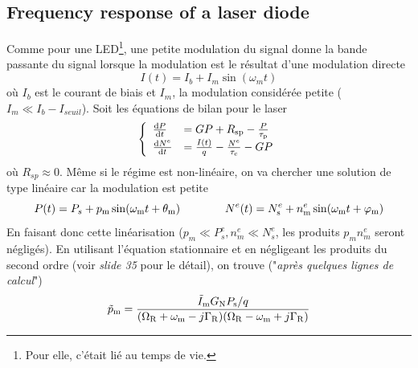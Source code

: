 \subsection{Frequency response of a laser diode}
Comme pour une LED\footnote{Pour elle, c'était lié au temps de vie.}, une petite modulation du signal
donne la bande passante du signal lorsque la modulation est le résultat d'une modulation directe
\begin{equation}
I(t) = {I_b} + {I_m}\sin ({\omega _m}t)
\end{equation}
où $I_b$ est le courant de biais et $I_m$, la modulation considérée petite ($I_m\ll I_b-I_{seuil}$). 
Soit les équations de bilan pour le laser 
\begin{equation}
\left\{\begin{array}{ll}
\frac{{{\rm{d}}P}}{{{\rm{d}}t}} &= GP + {R_{{\rm{sp}}}} - \frac{P}{{{\tau _{\rm{p}}}}}\\
\frac{{{\rm{d}}{N^e}}}{{{\rm{d}}t}} &= \frac{{I(t)}}{q} - \frac{{{N^e}}}{{{\tau _{\rm{c}}}}} - GP
\end{array}\right.
\end{equation}
où $R_{sp}\approx0$. Même si le régime est non-linéaire, on va chercher une solution de type linéaire
car la modulation est petite
\begin{equation}
P(t) = {P_s} + {p_{\rm{m}}}\sin ({\omega _{\rm{m}}}t + {\theta _{\rm{m}}})\qquad\qquad
{N^e}(t) = N_{\rm{s}}^e + n_{\rm{m}}^e\sin ({\omega _{\rm{m}}}t + {\varphi _{\rm{m}}})
\end{equation}
En faisant donc cette linéarisation ($p_m \ll P_s^e, n_m^e \ll N_s^e$, les produits $p_m n_m^e$ seront
négligés). En utilisant l'équation stationnaire et en négligeant les produits du second ordre (voir
\textit{slide 35} pour le détail), on trouve ("\textit{après quelques lignes de calcul}")
\begin{equation}
{\tilde p_{\rm{m}}} = \frac{{{{\tilde I}_{\rm{m}}}{G_{\rm{N}}}{P_{\rm{s}}}/q}}{{({\Omega _{\rm{R}}} +
{\omega _{\rm{m}}} - j{\Gamma _{\rm{R}}})({\Omega _{\rm{R}}} - {\omega _{\rm{m}}} + j{\Gamma _{\rm{R}}})}}
\end{equation}

